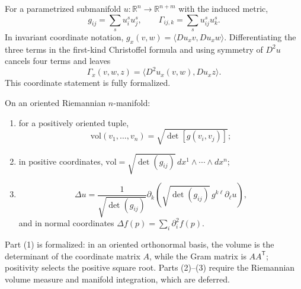 \begin{remark}
  \label{rem:pet-ch2-ex-22}


  For a parametrized submanifold
  $u:\mathbb{R}^n\to\mathbb{R}^{n+m}$ with the induced metric,
  \[
    g_{ij}=\sum_su^s_i u^s_j,\qquad
    \Gamma_{ij,k}=\sum_su^s_{ij}u^s_k.
  \]
  \sketch
  In invariant coordinate notation,
  $g_x(v,w)=\langle Du_xv,Du_xw\rangle$. Differentiating the three terms in
  the first-kind Christoffel formula and using symmetry of $D^2u$ cancels four
  terms and leaves
  \[
    \Gamma_x(v,w,z)=\langle D^2u_x(v,w),Du_xz\rangle.
  \]
  This coordinate statement is fully formalized.
\end{remark}

\begin{remark}
  \label{rem:pet-ch2-ex-23}


  On an oriented Riemannian $n$-manifold:
  \begin{enumerate}
    \item for a positively oriented tuple,
      \[
        \mathrm{vol}(v_1,\dots,v_n)
          =\sqrt{\det[g(v_i,v_j)]};
      \]
    \item in positive coordinates,
      $\mathrm{vol}=\sqrt{\det(g_{ij})}\,
        dx^1\wedge\cdots\wedge dx^n$;
    \item
      \[
        \Delta u
          =\frac1{\sqrt{\det(g_{ij})}}
             \partial_k\!\left(
               \sqrt{\det(g_{ij})}\,g^{k\ell}\partial_\ell u\right),
      \]
      and in normal coordinates
      $\Delta f(p)=\sum_i\partial_i^2f(p)$.
  \end{enumerate}
  \sketch
  Part (1) is formalized: in an oriented orthonormal basis, the volume is the
  determinant of the coordinate matrix $A$, while the Gram matrix is
  $AA^{\mathsf T}$; positivity selects the positive square root. Parts
  (2)--(3) require the Riemannian volume measure and manifold integration,
  which are deferred.
\end{remark}

